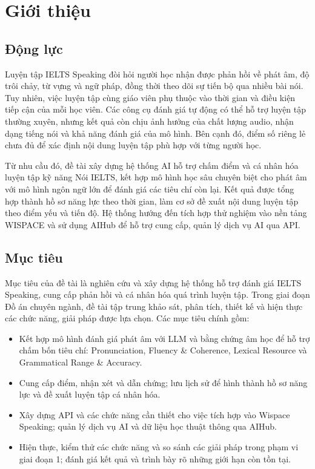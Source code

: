 
\section{Giới thiệu}

\subsection{Động lực}
\indent Luyện tập IELTS Speaking đòi hỏi người học nhận được phản hồi về phát âm, độ trôi chảy, từ vựng và ngữ pháp, đồng thời theo dõi sự tiến bộ qua nhiều bài nói. Tuy nhiên, việc luyện tập cùng giáo viên phụ thuộc vào thời gian và điều kiện tiếp cận của mỗi học viên. Các công cụ đánh giá tự động có thể hỗ trợ luyện tập thường xuyên, nhưng kết quả còn chịu ảnh hưởng của chất lượng audio, nhận dạng tiếng nói và khả năng đánh giá của mô hình. Bên cạnh đó, điểm số riêng lẻ chưa đủ để xác định nội dung luyện tập phù hợp với từng người học.

\indent Từ nhu cầu đó, đề tài xây dựng hệ thống AI hỗ trợ chấm điểm và cá nhân hóa luyện tập kỹ năng Nói IELTS, kết hợp mô hình học sâu chuyên biệt cho phát âm với mô hình ngôn ngữ lớn để đánh giá các tiêu chí còn lại. Kết quả được tổng hợp thành hồ sơ năng lực theo thời gian, làm cơ sở đề xuất nội dung luyện tập theo điểm yếu và tiến độ. Hệ thống hướng đến tích hợp thử nghiệm vào nền tảng WISPACE và sử dụng AIHub để hỗ trợ cung cấp, quản lý dịch vụ AI qua API.

\subsection{Mục tiêu}
\indent Mục tiêu của đề tài là nghiên cứu và xây dựng hệ thống hỗ trợ đánh giá IELTS Speaking, cung cấp phản hồi và cá nhân hóa quá trình luyện tập. Trong giai đoạn Đồ án chuyên ngành, đề tài tập trung khảo sát, phân tích, thiết kế và hiện thực các chức năng, giải pháp được lựa chọn. Các mục tiêu chính gồm:
\begin{itemize}
    \item Kết hợp mô hình đánh giá phát âm với LLM và bằng chứng âm học để hỗ trợ chấm bốn tiêu chí: Pronunciation, Fluency \& Coherence, Lexical Resource và Grammatical Range \& Accuracy.
    \item Cung cấp điểm, nhận xét và dẫn chứng; lưu lịch sử để hình thành hồ sơ năng lực và đề xuất luyện tập cá nhân hóa.
    \item Xây dựng API và các chức năng cần thiết cho việc tích hợp vào Wispace Speaking; quản lý dịch vụ AI và dữ liệu học thuật thông qua AIHub.
    \item Hiện thực, kiểm thử các chức năng và so sánh các giải pháp trong phạm vi giai đoạn 1; đánh giá kết quả và trình bày rõ những giới hạn còn tồn tại.
\end{itemize}

